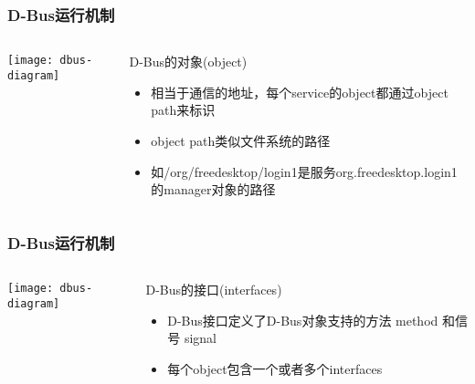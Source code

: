 \begin{frame}[fragile]
	\frametitle{D-Bus运行机制}
	
	\begin{columns}
		\begin{column}{.4\textwidth}
			
			\texttt{[image: dbus-diagram]}
			
		\end{column}
		\begin{column}{.6\textwidth}
			D-Bus的对象(object)
			\begin{itemize}
				\item 相当于通信的地址，每个service的object都通过object path来标识
				\item object path类似文件系统的路径
				\item 如/org/freedesktop/login1是服务org.freedesktop.login1的manager对象的路径
				
			\end{itemize}
		\end{column}
	\end{columns}
\end{frame}

\begin{frame}[fragile]
	\frametitle{D-Bus运行机制}
	
	\begin{columns}
		\begin{column}{.4\textwidth}
			
			\texttt{[image: dbus-diagram]}
			
		\end{column}
		\begin{column}{.6\textwidth}
			D-Bus的接口(interfaces)
			\begin{itemize}
				\item D-Bus接口定义了D-Bus对象支持的方法 method 和信号 signal
				\item 每个object包含一个或者多个interfaces				
			\end{itemize}
		\end{column}
	\end{columns}
\end{frame}

